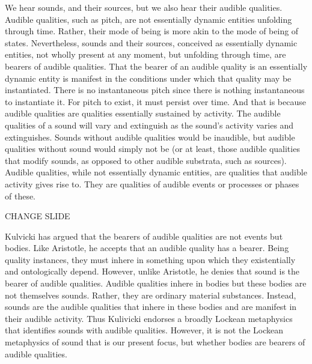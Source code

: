 \documentclass[12pt]{article}
\begin{document}
We hear sounds, and their sources, but we also hear their audible qualities. Audible qualities, such as pitch, are not essentially dynamic entities unfolding through time. Rather, their mode of being is more akin to the mode of being of states. Nevertheless, sounds and their sources, conceived as essentially dynamic entities, not wholly present at any moment, but unfolding through time, are bearers of audible qualities. That the bearer of an audible quality is an essentially dynamic entity is manifest in the conditions under which that quality may be instantiated. There is no instantaneous pitch since there is nothing instantaneous to instantiate it. For pitch to exist, it must persist over time. And that is because audible qualities are qualities essentially sustained by activity. The audible qualities of a sound will vary and extinguish as the sound’s activity varies and extinguishes. Sounds without audible qualities would be inaudible, but audible qualities without sound would simply not be (or at least, those audible qualities that modify sounds, as opposed to other audible substrata, such as sources). Audible qualities, while not essentially dynamic entities, are qualities that audible activity gives rise to. They are qualities of audible events or processes or phases of these.


CHANGE SLIDE

Kulvicki has argued that the bearers of audible qualities are not events but bodies. Like Aristotle, he accepts that an audible quality has a bearer. Being quality instances, they must inhere in something upon which they existentially and ontologically depend. However, unlike Aristotle, he denies that sound is the bearer of audible qualities. Audible qualities inhere in bodies but these bodies are not themselves sounds. Rather, they are ordinary material substances. Instead, sounds are the audible qualities that inhere in these bodies and are manifest in their audible activity. Thus Kulivicki endorses a broadly Lockean metaphysics that identifies sounds with audible qualities. However, it is not the Lockean metaphysics of sound that is our present focus, but whether bodies are bearers of audible qualities.
\end{document}
